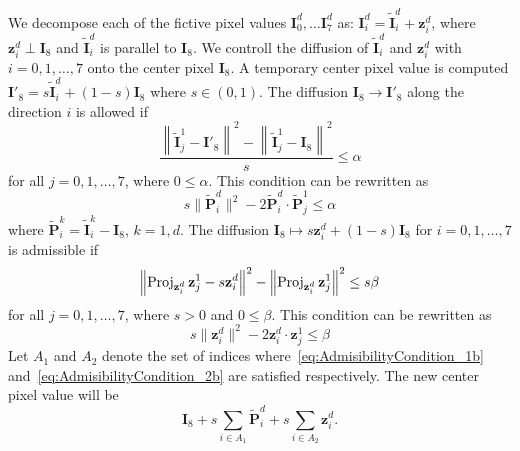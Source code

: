 We decompose each of the fictive pixel values $\mathbf I_0^d,\ldots\mathbf I_7^d$ as:
$\mathbf I_i^d=\tilde{\mathbf I}_i^d+{\mathbf z}_i^d$, where ${\mathbf z}_i^d\perp{\mathbf I}_8$ and $\tilde{\mathbf I}_i^d$ is parallel to ${\mathbf I}_8$.
We controll the diffusion of $\tilde{\mathbf I}_i^d$ and $\mathbf z_i^d$ with $i=0,1,\ldots,7$ onto the center pixel $\mathbf I_8$. A temporary center pixel value is computed $\mathbf I'_8=s\tilde{\mathbf I}_i^d+(1- s)\mathbf I_8$ where $s\in (0,1)$.
The diffusion $\mathbf I_8\to\mathbf I'_8$ along the direction $i$ is allowed if
\begin{equation}
\label{eq:AdmisibilityCondition_1a}
\frac{
\left\|
	\tilde{\mathbf I}_j^1-\mathbf I'_8
\right\|^2
-\left\|
	\tilde{\mathbf I}_j^1
	-
	{\mathbf I}_8
\right\|^2}{s}\leq\alpha
\end{equation}
for all $j=0,1,\ldots,7$, where $0\leq\alpha$.
This condition can be rewritten as
\begin{equation}
\label{eq:AdmisibilityCondition_1b}
 s\big\|\tilde{\mathbf P}_i^d\big\|^2
-2\tilde{\mathbf P}_i^d\cdot\tilde{\mathbf P}_j^1\leq\alpha
\end{equation}
where $\tilde{\mathbf P}_i^k=\tilde{\mathbf I}_i^k-\mathbf I_8$, $k=1,d$.
The diffusion $\mathbf I_8\mapsto s{\mathbf z}_i^d+(1- s)\mathbf I_8$ for $i=0,1,\ldots,7$ is admissible if
\begin{equation}
\label{eq:AdmisibilityCondition_2a}
\left\|
	\operatorname{Proj}_{{\mathbf z}_i^d}{\mathbf z}_j^1
	-
	 s{\mathbf z}_i^d
\right\|^2
-
\left\|
	\operatorname{Proj}_{{\mathbf z}_i^d}{\mathbf z}_j^1
\right\|^2
\leq s\beta
\end{equation}
for all $j=0,1,\ldots,7$, where $ s>0$ and $0\leq\beta$.
This condition can be rewritten as
\begin{equation}
\label{eq:AdmisibilityCondition_2b}
 s\big\|{\mathbf z}_i^d\big\|^2
-2{\mathbf z}_i^d\cdot{\mathbf z}_j^1\leq\beta
\end{equation}
Let $A_1$ and $A_2$ denote the set of indices where~\eqref{eq:AdmisibilityCondition_1b} and~\eqref{eq:AdmisibilityCondition_2b} are satisfied respectively.
The new center pixel value will be
$$\mathbf I_8
+ s\sum_{i\in A_1}\tilde{\mathbf P}_i^d
+ s\sum_{i\in A_2}\mathbf z_i^d.
$$

\endinput
Define
$\tilde P_i=\frac{\tilde{\mathbf P}_i\cdot{\mathbf I}_8}{\|{\mathbf I}_8\|}$. We have plotted the admissibility condition in figure~\ref{fig:admisibilityConditions}. The boundaries of the regions in the figures are hyperbolas with principal axis of length $2a=\sqrt{2\alpha(\sqrt{s^2+4}-s)}$. One asymptote is vertical and the other has slope $s/2$.
\begin{figure}[h]
\centering

\def\lam{25}
\def\ess{.5}
\tripplefigure
\def\lam{5}
\def\ess{.5}
\tripplefigure
\caption{Diffusion from $i$ to the center pixel is allowed if and only if each pair of points $(\tilde P_i,\tilde P_i)$ for $j=0,\cdots,7$ are in the grey region.
The admissibility conditions are plotted for
$(\alpha,s)=(25,0.5)$ and
$(\alpha,s)=(5,0.5)$.
}
\label{fig:admisibilityConditions}
\end{figure}

